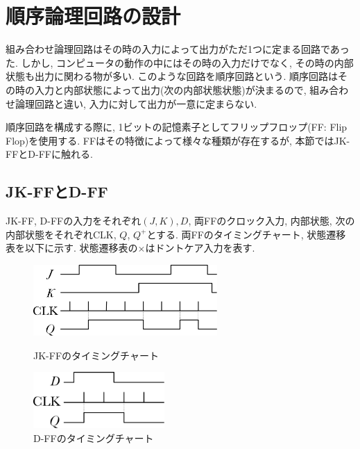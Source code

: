 \documentclass[titlepage]{jsarticle}
\begin{document}
\section{順序論理回路の設計}
  組み合わせ論理回路はその時の入力によって出力がただ1つに定まる回路であった.
  しかし, コンピュータの動作の中にはその時の入力だけでなく, その時の内部状態も出力に関わる物が多い.
  このような回路を順序回路という.
  順序回路はその時の入力と内部状態によって出力(次の内部状態状態)が決まるので,
  組み合わせ論理回路と違い, 入力に対して出力が一意に定まらない.

  順序回路を構成する際に, 1ビットの記憶素子としてフリップフロップ(FF: Flip Flop)を使用する.
  FFはその特徴によって様々な種類が存在するが, 本節ではJK-FFとD-FFに触れる.
  \subsection{JK-FFとD-FF} \label{subsec:jk_and_d}
    JK-FF, D-FFの入力をそれぞれ$(J, K), D$, 両FFのクロック入力,
    内部状態, 次の内部状態をそれぞれCLK, $Q$, $Q^+$とする.
    両FFのタイミングチャート, 状態遷移表を以下に示す.
    状態遷移表の$\times$はドントケア入力を表す.
    \begin{figure}[h]
      \begin{minipage}{0.495\hsize}
        \centering
        \includegraphics[width=7cm]{images/jk_timing.pdf}
        \caption{JK-FFのタイミングチャート}
      \end{minipage}
      \begin{minipage}{0.495\hsize}
        \centering
        \includegraphics[width=5cm]{images/d_timing.pdf}
        \caption{D-FFのタイミングチャート}
      \end{minipage}
    \end{figure}
\end{document}

